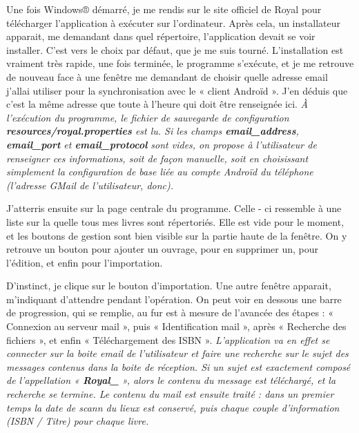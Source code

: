 Une fois Windows® démarré, je me rendis sur le site officiel de Royal pour télécharger l'application à exécuter sur l'ordinateur. 
Après cela, un installateur apparait, me demandant dans quel répertoire, l'application devait se voir installer. 
C'est vers le choix par défaut, que je me suis tourné. 
L'installation est vraiment très rapide, une fois terminée, le programme s'exécute, et je me retrouve de nouveau face à une fenêtre me demandant de choisir quelle adresse email j'allai utiliser pour la synchronisation avec le « client Androïd ». 
J'en déduis que c'est la même adresse que toute à l'heure qui doit être renseignée ici.
\emph{À l'exécution du programme, le fichier de sauvegarde de configuration \textbf{resources/royal.properties} est lu. 
	Si les champs \textbf{email\_address}, \textbf{email\_port} et \textbf{email\_protocol} sont vides, 
	on propose à l'utilisateur de renseigner ces informations, soit de façon manuelle, 
	soit en choisissant simplement la configuration de base liée au compte Androïd du téléphone (l'adresse GMail de l'utilisateur, donc).
}

J'atterris ensuite sur la page centrale du programme. 
Celle - ci ressemble à une liste sur la quelle tous mes livres sont répertoriés. 
Elle est vide pour le moment, et les boutons de gestion sont bien visible sur la partie haute de la fenêtre. 
On y retrouve un bouton pour ajouter un ouvrage, pour en supprimer un, pour l'édition, et enfin pour l'importation. 

D'instinct, je clique sur le bouton d'importation.
Une autre fenêtre apparait, m'indiquant d'attendre pendant l'opération. 
On peut voir en dessous une barre de progression, qui se remplie, au fur est à mesure de l'avancée des étapes : 
« Connexion au serveur mail », puis « Identification mail », après « Recherche des fichiers », et enfin « Téléchargement des ISBN ».
\emph{L'application va en effet se connecter sur la boite email de l'utilisateur et faire une recherche sur le sujet des messages contenus dans la boite de réception.
	Si un sujet est exactement composé de l'appellation « \textbf{Royal\_} », alors le contenu du message est téléchargé, et la recherche se termine.
	Le contenu du mail est ensuite traité : dans un premier temps la date de scann du lieux est conservé, puis chaque couple d'information (ISBN \slash{} Titre) pour chaque livre. 
}


